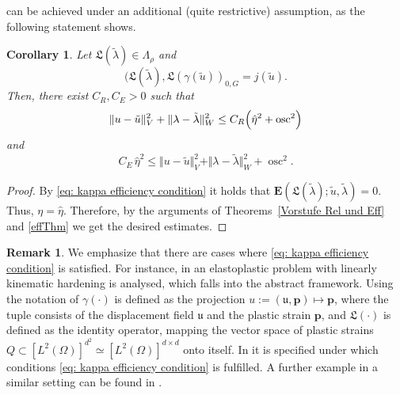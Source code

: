 \documentclass[12pt,twoside,reqno]{amsart}
\newtheorem{corollary}{Corollary}[section]
\theoremstyle{definition}
\newtheorem{remark}{Remark}[section]
\numberwithin{equation}{section}
\renewcommand{\L}{\mathfrak{L}}
\newcommand{\norm}[1]    {\Vert #1 \Vert}
\begin{document}
can be achieved under an additional (quite restrictive) assumption, as the following statement shows.
    \begin{corollary}
        Let $\L(\tilde{\lambda})\in \Lambda_\rho$ and
            \begin{equation}\label{eq: kappa efficiency condition}
                (\L(\tilde{\lambda}),\L(\gamma(\tilde{u}))_{0,G} = j(\tilde{u}).
            \end{equation}
        Then, there exist $C_R, C_E>0$ such that
        \begin{equation*}
            \norm{u-\tilde{u}}_V^2+\norm{{\lambda}-{\tilde{\lambda}}}_{W}^2 \leq C_R\Bigl(\hat{\eta}^2+\operatorname{osc}^2\Bigr)
        \end{equation*}
        and
        \begin{equation*}
            C_E\,\hat{\eta}^2\leq \norm{u-\tilde{u}}_V^2 + \norm{{\lambda}-{\tilde{\lambda}}}_{W}^2 + \operatorname{osc}^2.
        \end{equation*}
    \end{corollary}
    \begin{proof}
         By \eqref{eq: kappa efficiency condition} it holds that $\bm{E}(\L({\tilde{\lambda}});\tilde{u},\tilde{\lambda})=0$. Thus, $\eta = \hat\eta$. Therefore, by the arguments of Theorems~\ref{Vorstufe Rel und Eff} and \ref{effThm} we get the desired estimates.
    \end{proof}
    \begin{remark}
       We emphasize that there are cases where \eqref{eq: kappa efficiency condition} is satisfied. For instance, in \cite{Bammer2025e} an elastoplastic problem with linearly kinematic hardening is analysed, which falls into the abstract framework. Using the notation of \cite{Bammer2025e} $\gamma(\cdot)$ is defined as the projection $u:=(\mathfrak{u},\bm{p})\mapsto\bm{p}$, where the tuple consists of the displacement field $\mathfrak{u}$ and the plastic strain $\bm{p}$, and $\L(\cdot)$ is defined as the identity operator, mapping the vector space of plastic strains $Q\subset[L^2(\Omega)]^{d^2}\simeq[L^2(\Omega)]^{d\times d}$ onto itself. In \cite[Rem.~2]{Bammer2025e} it is specified under which conditions \eqref{eq: kappa efficiency condition} is fulfilled. A further example in a similar setting can be found in \cite[Sec.~4]{Schroder2011}.
    \end{remark}
    
\end{document}
